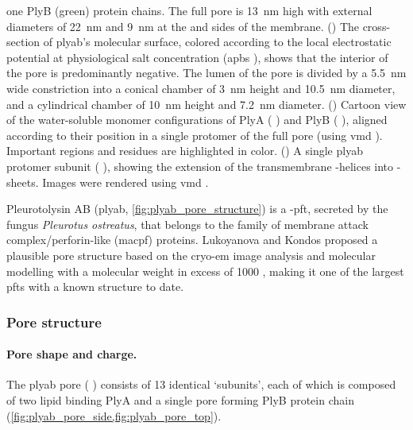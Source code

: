 \begin{figure*}[p]
{  one PlyB (green) protein chains. The full pore is \SI{13}{\nm} high with external diameters of \SI{22}{\nm}
  and \SI{9}{\nm} at the \cisi{} and \transi{} sides of the membrane. 
  ()
  The cross-section of \gls{plyab}'s molecular surface, colored according to the local electrostatic potential
  at physiological salt concentration (\gls{apbs} \cite{Baker-2001,Baker-2005}), shows that the interior of
  the pore is predominantly negative. The lumen of the pore is divided by a \SI{5.5}{\nm} wide constriction
  into a conical \cisi{} chamber of \SI{3}{\nm} height and \SI{10.5}{\nm} diameter, and a cylindrical
  \transi{} chamber of \SI{10}{\nm} height and \SI{7.2}{\nm} diameter. 
  ()
  Cartoon view of the water-soluble monomer configurations of PlyA (
  \cite{Lukoyanova-Kondos-2015}) and PlyB ( \cite{Lukoyanova-Kondos-2015}), aligned according to
  their position in a single protomer of the full pore (using \gls{vmd} \cite{Humphrey-1996}). Important
  regions and residues are highlighted in color.
  ()
  A single \gls{plyab} protomer subunit ( \cite{Lukoyanova-Kondos-2015}), showing the extension of
  the transmembrane \ta-helices into \tb-sheets.
  Images were rendered using \gls{vmd} \cite{Humphrey-1996,Stone-1998}.
  }\label{fig:plyab_pore_structure}
\end{figure*}

Pleurotolysin AB (\gls{plyab}, \cref{fig:plyab_pore_structure}) is a \tb-\gls{pft}, secreted by the fungus
\textit{Pleurotus ostreatus}, that belongs to the family of membrane attack complex/perforin-like
(\gls{macpf}) proteins. Lukoyanova and Kondos \etal{} proposed a plausible pore structure based on the
\gls{cryo-em} image analysis and molecular modelling with a molecular weight in excess of \SI{1000}{\kDa}
\cite{Lukoyanova-Kondos-2015}, making it one of the largest \glspl{pft} with a known structure to date.


\subsubsection{Pore structure}

\paragraph{Pore shape and charge.}
%
The \gls{plyab} pore ( \cite{Lukoyanova-Kondos-2015}) consists of 13 identical `subunits', each of
which is composed of two lipid binding PlyA and a single pore forming PlyB protein chain (\cref{fig:plyab_pore_side,fig:plyab_pore_top}).

